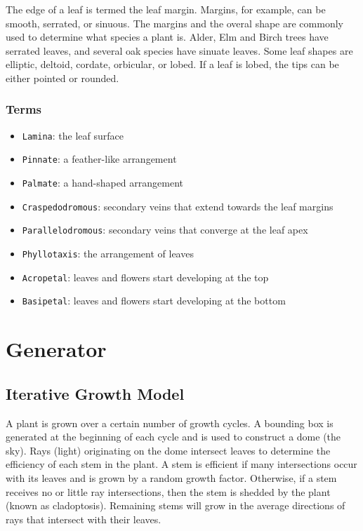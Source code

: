 \documentclass[10pt]{article}
\begin{document}
The edge of a leaf is termed the leaf margin. Margins, for example, can be smooth, serrated, or sinuous. The margins and the overal shape are commonly used to determine what species a plant is. Alder, Elm and Birch trees have serrated leaves, and several oak species have sinuate leaves. Some leaf shapes are elliptic, deltoid, cordate, orbicular, or lobed. If a leaf is lobed, the tips can be either pointed or rounded.

\subsubsection{Terms}
\begin{itemize}
\item \texttt{Lamina}: the leaf surface
\item \texttt{Pinnate}: a feather-like arrangement
\item \texttt{Palmate}: a hand-shaped arrangement
\item \texttt{Craspedodromous}: secondary veins that extend towards the leaf margins
\item \texttt{Parallelodromous}: secondary veins that converge at the leaf apex
\item \texttt{Phyllotaxis}: the arrangement of leaves
\item \texttt{Acropetal}: leaves and flowers start developing at the top
\item \texttt{Basipetal}: leaves and flowers start developing at the bottom
\end{itemize}

\section{Generator}
\subsection{Iterative Growth Model}
A plant is grown over a certain number of growth cycles. A bounding box is generated at the beginning of each cycle and is used to construct a dome (the sky). Rays (light) originating on the dome intersect leaves to determine the efficiency of each stem in the plant. A stem is efficient if many intersections occur with its leaves and is grown by a random growth factor. Otherwise, if a stem receives no or little ray intersections, then the stem is shedded by the plant (known as cladoptosis). Remaining stems will grow in the average directions of rays that intersect with their leaves.
\end{document}
